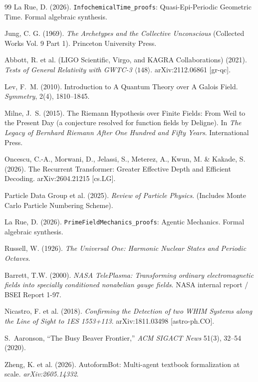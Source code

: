 \begin{thebibliography}{99}
La Rue, D. (2026).
\texttt{InfochemicalTime\_proofs}: Quasi-Epi-Periodic Geometric Time.
Formal algebraic synthesis.

Jung, C. G. (1969).
\textit{The Archetypes and the Collective Unconscious} (Collected Works Vol. 9 Part 1).
Princeton University Press.

Abbott, R. et al. (LIGO Scientific, Virgo, and KAGRA Collaborations) (2021).
\textit{Tests of General Relativity with GWTC-3} $\langle 148 \rangle$.
arXiv:2112.06861 [gr-qc].

Lev, F.~M. (2010).
Introduction to A Quantum Theory over A Galois Field.
\textit{Symmetry}, 2(4), 1810--1845.

Milne, J.~S. (2015).
The Riemann Hypothesis over Finite Fields: From Weil to the Present Day (a conjecture resolved for function fields by Deligne).
In \textit{The Legacy of Bernhard Riemann After One Hundred and Fifty Years}. International Press.

Oncescu, C.-A., Morwani, D., Jelassi, S., Meterez, A., Kwun, M. \& Kakade, S. (2026).
The Recurrent Transformer: Greater Effective Depth and Efficient Decoding.
arXiv:2604.21215 [cs.LG].

Particle Data Group et al. (2025).
\textit{Review of Particle Physics}. 
(Includes Monte Carlo Particle Numbering Scheme).

La Rue, D. (2026).
\texttt{PrimeFieldMechanics\_proofs}: Agentic Mechanics.
Formal algebraic synthesis.

Russell, W. (1926).
\textit{The Universal One: Harmonic Nuclear States and Periodic Octaves}.

Barrett, T.W. (2000).
\textit{NASA TelePlasma: Transforming ordinary electromagnetic fields into specially conditioned nonabelian gauge fields}.
NASA internal report / BSEI Report 1-97.

Nicastro, F. et al. (2018).
\textit{Confirming the Detection of two WHIM Systems along the Line of Sight to 1ES 1553+113}.
arXiv:1811.03498 [astro-ph.CO].

S.~Aaronson,
``The Busy Beaver Frontier,''
\emph{ACM SIGACT News} 51(3), 32--54 (2020).

Zheng, K. et al. (2026). AutoformBot: Multi-agent textbook formalization at scale. \emph{arXiv:2605.14332}.


\end{thebibliography}
